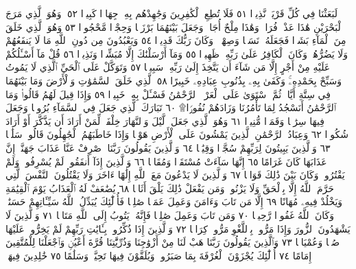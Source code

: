لَبَعَثْنَا فِي كُلِّ قَرْيَةࣲ نَّذِيرࣰا ٥١ فَلَا تُطِعِ ٱلْكَٰفِرِينَ وَجَٰهِدْهُم
بِهِۦ جِهَادࣰا كَبِيرࣰا ٥٢۞ وَهُوَ ٱلَّذِي مَرَجَ ٱلْبَحْرَيْنِ هَٰذَا
عَذْبࣱ فُرَاتࣱ وَهَٰذَا مِلْحٌ أُجَاجࣱ وَجَعَلَ بَيْنَهُمَا بَرْزَخࣰا
وَحِجْرࣰا مَّحْجُورࣰا ٥٣ وَهُوَ ٱلَّذِي خَلَقَ مِنَ ٱلْمَآءِ بَشَرࣰا فَجَعَلَهُۥ
نَسَبࣰا وَصِهْرࣰاۗ وَكَانَ رَبُّكَ قَدِيرࣰا ٥٤ وَيَعْبُدُونَ مِن دُونِ ٱللَّهِ
مَا لَا يَنفَعُهُمْ وَلَا يَضُرُّهُمْۗ وَكَانَ ٱلْكَافِرُ عَلَىٰ رَبِّهِۦ ظَهِيرࣰا ٥٥
وَمَآ أَرْسَلْنَٰكَ إِلَّا مُبَشِّرࣰا وَنَذِيرࣰا ٥٦ قُلْ مَآ أَسْـَٔلُكُمْ عَلَيْهِ
مِنْ أَجْرٍ إِلَّا مَن شَآءَ أَن يَتَّخِذَ إِلَىٰ رَبِّهِۦ سَبِيلࣰا ٥٧ وَتَوَكَّلْ
عَلَى ٱلْحَيِّ ٱلَّذِي لَا يَمُوتُ وَسَبِّحْ بِحَمْدِهِۦۚ وَكَفَىٰ بِهِۦ
بِذُنُوبِ عِبَادِهِۦ خَبِيرًا ٥٨ ٱلَّذِي خَلَقَ ٱلسَّمَٰوَٰتِ وَٱلْأَرْضَ
وَمَا بَيْنَهُمَا فِي سِتَّةِ أَيَّامࣲ ثُمَّ ٱسْتَوَىٰ عَلَى ٱلْعَرْشِۖ ٱلرَّحْمَٰنُ
فَسْـَٔلْ بِهِۦ خَبِيرࣰا ٥٩ وَإِذَا قِيلَ لَهُمُ  قَالُوا۟
وَمَا ٱلرَّحْمَٰنُ أَنَسْجُدُ لِمَا تَأْمُرُنَا وَزَادَهُمْ نُفُورࣰا۩ ٦٠ تَبَارَكَ
ٱلَّذِي جَعَلَ فِي ٱلسَّمَآءِ بُرُوجࣰا وَجَعَلَ فِيهَا سِرَٰجࣰا وَقَمَرࣰا
مُّنِيرࣰا ٦١ وَهُوَ ٱلَّذِي جَعَلَ ٱلَّيْلَ وَٱلنَّهَارَ خِلْفَةࣰ لِّمَنْ أَرَادَ
أَن يَذَّكَّرَ أَوْ أَرَادَ شُكُورࣰا ٦٢ وَعِبَادُ ٱلرَّحْمَٰنِ ٱلَّذِينَ يَمْشُونَ
عَلَى ٱلْأَرْضِ هَوْنࣰا وَإِذَا خَاطَبَهُمُ ٱلْجَٰهِلُونَ قَالُوا۟ سَلَٰمࣰا ٦٣
وَٱلَّذِينَ يَبِيتُونَ لِرَبِّهِمْ سُجَّدࣰا وَقِيَٰمࣰا ٦٤ وَٱلَّذِينَ
يَقُولُونَ رَبَّنَا ٱصْرِفْ عَنَّا عَذَابَ جَهَنَّمَۖ إِنَّ عَذَابَهَا كَانَ
غَرَامًا ٦٥ إِنَّهَا سَآءَتْ مُسْتَقَرࣰّا وَمُقَامࣰا ٦٦ وَٱلَّذِينَ إِذَآ
أَنفَقُوا۟ لَمْ يُسْرِفُوا۟ وَلَمْ يَقْتُرُوا۟ وَكَانَ بَيْنَ ذَٰلِكَ قَوَامࣰا ٦٧
وَٱلَّذِينَ لَا يَدْعُونَ مَعَ ٱللَّهِ إِلَٰهًا ءَاخَرَ وَلَا يَقْتُلُونَ
ٱلنَّفْسَ ٱلَّتِي حَرَّمَ ٱللَّهُ إِلَّا بِٱلْحَقِّ وَلَا يَزْنُونَۚ وَمَن
يَفْعَلْ ذَٰلِكَ يَلْقَ أَثَامࣰا ٦٨ يُضَٰعَفْ لَهُ ٱلْعَذَابُ
يَوْمَ ٱلْقِيَٰمَةِ وَيَخْلُدْ فِيهِۦ مُهَانًا ٦٩ إِلَّا مَن تَابَ
وَءَامَنَ وَعَمِلَ عَمَلࣰا صَٰلِحࣰا فَأُو۟لَٰٓئِكَ يُبَدِّلُ ٱللَّهُ
سَيِّـَٔاتِهِمْ حَسَنَٰتࣲۗ وَكَانَ ٱللَّهُ غَفُورࣰا رَّحِيمࣰا ٧٠
وَمَن تَابَ وَعَمِلَ صَٰلِحࣰا فَإِنَّهُۥ يَتُوبُ إِلَى ٱللَّهِ مَتَابࣰا ٧١
وَٱلَّذِينَ لَا يَشْهَدُونَ ٱلزُّورَ وَإِذَا مَرُّوا۟ بِٱللَّغْوِ مَرُّوا۟ كِرَامࣰا ٧٢
وَٱلَّذِينَ إِذَا ذُكِّرُوا۟ بِـَٔايَٰتِ رَبِّهِمْ لَمْ يَخِرُّوا۟ عَلَيْهَا
صُمࣰّا وَعُمْيَانࣰا ٧٣ وَٱلَّذِينَ يَقُولُونَ رَبَّنَا هَبْ لَنَا
مِنْ أَزْوَٰجِنَا وَذُرِّيَّٰتِنَا قُرَّةَ أَعْيُنࣲ وَٱجْعَلْنَا لِلْمُتَّقِينَ
إِمَامًا ٧٤ أُو۟لَٰٓئِكَ يُجْزَوْنَ ٱلْغُرْفَةَ بِمَا صَبَرُوا۟
وَيُلَقَّوْنَ فِيهَا تَحِيَّةࣰ وَسَلَٰمًا ٧٥ خَٰلِدِينَ فِيهَاۚ
